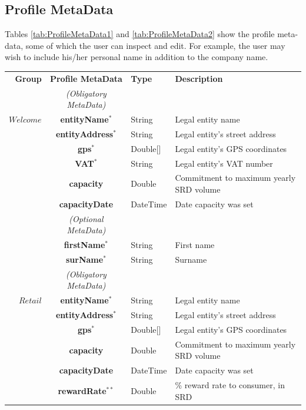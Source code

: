 \subsection{Profile MetaData}
Tables \ref{tab:ProfileMetaData1} and \ref{tab:ProfileMetaData2} show the profile meta-data, some of which the user can inspect and edit. For example, the user may wish to include his/her personal name in addition to the company name.

\setlength{\tabcolsep}{10pt}
\begin{table}[H]
\begin{centering}
\small
{
\begin{tabular}{ r | c | l | l }
\hline
\textbf{Group}	& {\bf Profile MetaData} & {\bf Type} & {\bf Description} \\
\Xhline{1.5pt}
			& \emph{(Obligatory MetaData)} & & \\
\cline{2-2}
$Welcome$	& {\bf entityName}$^*$		&String	& Legal entity name \\
			& {\bf entityAddress}$^*$		&String	& Legal entity's street address \\
			& {\bf gps}$^*$				&Double[]	& Legal entity's GPS coordinates \\			
			& {\bf VAT}$^*$				&String	& Legal entity's VAT number \\
			& {\bf capacity}				&Double	& Commitment to maximum yearly SRD volume \\
			& {\bf capacityDate}			&DateTime & Date capacity was set \\
\cline{2-2}
			 & \emph{(Optional MetaData)}& & \\
\cline{2-2}
			& {\bf firstName}$^*$			&String	& First name \\
			& {\bf surName}$^*$			&String	& Surname \\
\Xhline{1.5pt}
			& \emph{(Obligatory MetaData)} & & \\
\cline{2-2}
$Retail$		& {\bf entityName}$^*$		&String	& Legal entity name \\
			& {\bf entityAddress}$^*$		&String	& Legal entity's street address \\
			& {\bf gps}$^*$				&Double[]	& Legal entity's GPS coordinates \\			
			& {\bf capacity}				&Double	& Commitment to maximum yearly SRD volume \\
			& {\bf capacityDate}			&DateTime & Date capacity was set \\
			& {\bf rewardRate}$^{**}$		&Double	& \% reward rate to consumer, in SRD \\

\end{tabular}}
\end{centering}
\end{table}
